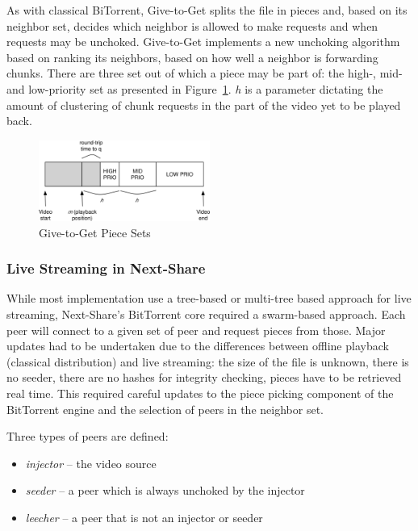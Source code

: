 As with classical BiTorrent, Give-to-Get splits the file in pieces and, based
on its neighbor set, decides which neighbor is allowed to make requests and
when requests may be unchoked. Give-to-Get implements a new unchoking
algorithm based on ranking its neighbors, based on how well a neighbor is
forwarding chunks. There are three set out of which a piece may be part of:
the high-, mid- and low-priority set as presented in
Figure~\ref{fig:multimedia-dist:gtg-sets}. \textit{h} is a parameter dictating the amount of
clustering of chunk requests in the part of the video yet to be played back.

\begin{figure}
  \centering
  \includegraphics[width=0.5\textwidth]{src/img/multimedia-dist/gtg-sets}
  \caption{Give-to-Get Piece Sets~\cite{give-to-get}}
  \label{fig:multimedia-dist:gtg-sets}
\end{figure}

\subsubsection{Live Streaming in Next-Share}

While most implementation use a tree-based or multi-tree based approach for
live streaming, Next-Share's BitTorrent core required a swarm-based approach.
Each peer will connect to a given set of peer and request pieces from those.
Major updates had to be undertaken due to the differences between offline
playback (classical distribution) and live streaming: the size of the file is
unknown, there is no seeder, there are no hashes for integrity checking,
pieces have to be retrieved real time. This required careful updates to the
piece picking component of the BitTorrent engine and the selection of peers in
the neighbor set.

Three types of peers are defined:
\begin{itemize}
  \item \textit{injector} -- the video source
  \item \textit{seeder} -- a peer which is always unchoked by the injector
  \item \textit{leecher} -- a peer that is not an injector or seeder
\end{itemize}

